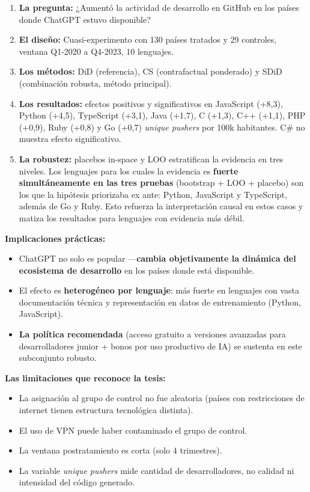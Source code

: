 \documentclass[11pt,a4paper]{article}
\begin{document}
\begin{enumerate}[leftmargin=*]
  \item \textbf{La pregunta:} ¿Aumentó la actividad de desarrollo en GitHub en los países donde ChatGPT estuvo disponible?
  \item \textbf{El diseño:} Cuasi-experimento con 130 países tratados y 29 controles, ventana Q1-2020 a Q4-2023, 10 lenguajes.
  \item \textbf{Los métodos:} DiD (referencia), CS (contrafactual ponderado) y SDiD (combinación robusta, método principal).
  \item \textbf{Los resultados:} efectos positivos y significativos en JavaScript (+8,3), Python (+4,5), TypeScript (+3,1), Java (+1,7), C (+1,3), C++ (+1,1), PHP (+0,9), Ruby (+0,8) y Go (+0,7) \textit{unique pushers} por 100k habitantes. C\# no muestra efecto significativo.
  \item \textbf{La robustez:} placebos in-space y LOO estratifican la evidencia en tres niveles. Los lenguajes para los cuales la evidencia es \textbf{fuerte simultáneamente en las tres pruebas} (bootstrap + LOO + placebo) son los que la hipótesis priorizaba ex ante: Python, JavaScript y TypeScript, además de Go y Ruby. Esto refuerza la interpretación causal en estos casos y matiza los resultados para lenguajes con evidencia más débil.
\end{enumerate}

\textbf{Implicaciones prácticas:}

\begin{itemize}[leftmargin=*]
  \item ChatGPT no solo es popular —\textbf{cambia objetivamente la dinámica del ecosistema de desarrollo} en los países donde está disponible.
  \item El efecto es \textbf{heterogéneo por lenguaje}: más fuerte en lenguajes con vasta documentación técnica y representación en datos de entrenamiento (Python, JavaScript).
  \item \textbf{La política recomendada} (acceso gratuito a versiones avanzadas para desarrolladores junior + bonos por uso productivo de IA) se sustenta en este subconjunto robusto.
\end{itemize}

\textbf{Las limitaciones que reconoce la tesis:}

\begin{itemize}[leftmargin=*]
  \item La asignación al grupo de control no fue aleatoria (países con restricciones de internet tienen estructura tecnológica distinta).
  \item El uso de VPN puede haber contaminado el grupo de control.
  \item La ventana postratamiento es corta (solo 4 trimestres).
  \item La variable \textit{unique pushers} mide cantidad de desarrolladores, no calidad ni intensidad del código generado.
\end{itemize}
\end{document}
